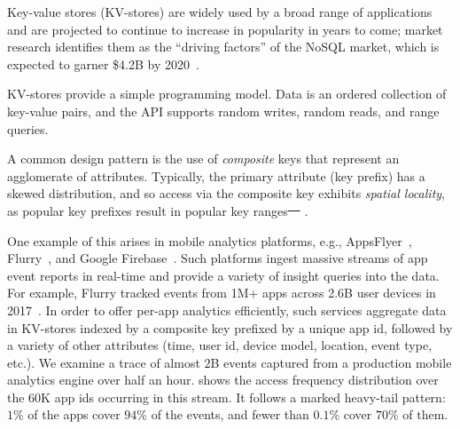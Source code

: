 \documentclass[sigplan,10pt]{acmart}
\providecommand{\DIFdel}[1]{{\protect\color{red}\sout{#1}}}                      %
\providecommand{\DIFdelbegin}{} %
\providecommand{\DIFdelend}{} %
\begin{document}
Key-value stores (KV-stores) are widely used  by a broad range of applications and are projected
to continue to increase in popularity in years to come; market research  identifies them as the 
``driving factors'' of the NoSQL market, which is expected to garner \$4.2B by 2020~\cite{alliedmarketresearch}.

KV-stores provide a simple programming model. 
Data is an ordered collection of key-value pairs, and the API supports random writes, 
random reads, and range queries. 

A common design pattern is the use of \emph{composite} keys that represent an agglomerate of attributes.
Typically, the primary attribute (key prefix) %
has a skewed distribution, and so   access via the composite key exhibits \emph{spatial locality}, as 
popular key prefixes result in popular key ranges\DIFdelbegin \DIFdel{~\mbox{%
\cite{facebook-workloads}}\hspace{0pt}%
}\DIFdelend . 

One example of this arises in mobile analytics platforms, e.g., AppsFlyer~\cite{appsflyer}, Flurry~\cite{flurry}, 
and Google Firebase~\cite{firebase}. %
Such platforms %
ingest massive streams of app event reports %
in  real-time and provide a variety of insight queries into the data. For example, Flurry tracked events from  
1M+ apps across 2.6B user devices  in 2017~\cite{FlurryReport2017}. In order to offer per-app analytics efficiently,
such services aggregate data in KV-stores indexed by a composite key prefixed by a unique app 
id,  followed by a variety of other attributes (time, user id, device model, location, event type, etc.).
%
We examine a trace of almost $2$B  events captured from a production mobile analytics engine 
over half an hour.  
 shows the access frequency distribution over the  $60$K app ids occurring in this stream. It follows a marked
heavy-tail pattern: 
$1$\% of the apps  cover $94$\% of the events, and fewer 
than $0.1$\% cover $70$\% of them. 

\end{document}
